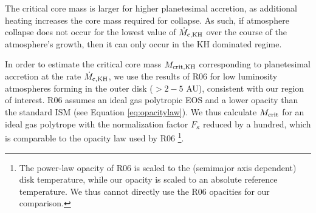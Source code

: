 \documentclass[apj]{emulateapj}
\newcommand{\co}{_{\rm c}}
\begin{document}
The critical core mass is larger for higher planetesimal accretion, as additional heating increases the core mass required for collapse. As such, if atmosphere collapse does not occur for the lowest value of $\dot{M}_{\rm c, KH}$ over the course of the atmosphere's growth, then it can only occur in the KH dominated regime. %







In order to estimate the critical core mass $M_{\rm crit, KH}$ corresponding to planetesimal accretion at the rate $\dot{M}_{\rm c, KH}$, we use the results of R06 for low luminosity atmospheres forming in the outer disk ($>2-5$ AU), consistent with our region of interest. R06 assumes an ideal gas polytropic EOS and a lower opacity than the standard ISM (see Equation \ref{eq:opacitylaw}). We thus calculate $M_{\rm crit}$ for an ideal gas polytrope with the normalization factor $F_{\kappa}$ reduced by a hundred, which is comparable to the opacity law used by R06 \footnote{The power-law opacity of R06 is scaled to the (semimajor axis dependent) disk temperature, while our opacity is scaled to an absolute reference temperature. We thus cannot directly use the R06 opacities for our comparison.}. %
\end{document}
